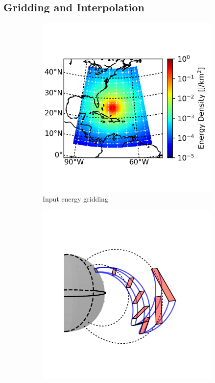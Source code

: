 \subsection{Gridding and Interpolation}

    \begin{figure}
    \centering
    \begin{subfigure}[t]{0.45\textwidth}
    \centering
        	\includegraphics{figures/input_energy_with_grid.png}
	\caption{Input energy gridding}
        \label{fig:input_energy_grid}
    \end{subfigure}\hfill
    \begin{subfigure}[t]{0.45\textwidth}
    \centering
        	\includegraphics[trim={1cm 0.25cm 1cm 1cm},clip]{figures/interpolation_globe1.pdf}

\end{subfigure}
\end{figure}

